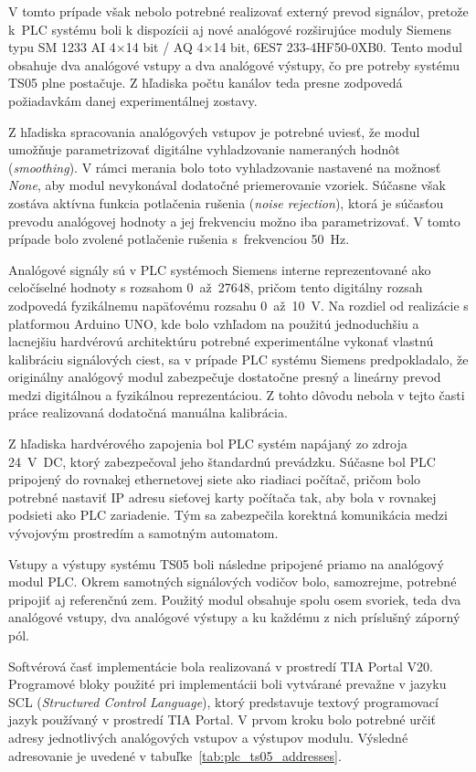 V tomto prípade však nebolo potrebné realizovať externý prevod signálov, pretože
k~PLC systému boli k dispozícii aj nové analógové rozširujúce moduly
Siemens typu SM 1233 AI 4×14 bit / AQ 4×14 bit, 6ES7 233-4HF50-0XB0. Tento modul
obsahuje dva analógové vstupy a dva analógové výstupy, čo pre potreby systému
TS05 plne postačuje. Z hľadiska počtu kanálov teda presne zodpovedá požiadavkám
danej experimentálnej zostavy.

Z hľadiska spracovania analógových vstupov je potrebné uviesť, že modul umožňuje
parametrizovať digitálne vyhladzovanie nameraných hodnôt (\textit{smoothing}).
V rámci merania bolo toto vyhladzovanie nastavené na možnosť \textit{None}, aby modul
nevykonával dodatočné priemerovanie vzoriek. Súčasne však zostáva aktívna funkcia
potlačenia rušenia (\textit{noise rejection}), ktorá je súčasťou prevodu analógovej
hodnoty a jej frekvenciu možno iba parametrizovať. V tomto prípade bolo zvolené potlačenie rušenia s~frekvenciou 50~Hz.

Analógové signály sú v PLC systémoch Siemens interne reprezentované
ako celočíselné hodnoty s rozsahom \mbox{0 až 27648}, pričom tento digitálny
rozsah zodpovedá fyzikálnemu napäťovému rozsahu \mbox{0 až 10~V}. Na rozdiel
od realizácie s platformou Arduino UNO, kde bolo vzhľadom na použitú
jednoduchšiu a lacnejšiu hardvérovú architektúru potrebné experimentálne
vykonať vlastnú kalibráciu signálových ciest, sa v prípade PLC systému
Siemens predpokladalo, že originálny analógový modul zabezpečuje
dostatočne presný a lineárny prevod medzi digitálnou a fyzikálnou reprezentáciou.
Z tohto dôvodu nebola v tejto časti práce realizovaná dodatočná manuálna
kalibrácia.

Z hľadiska hardvérového zapojenia bol PLC systém napájaný zo zdroja
\mbox{24~V~DC}, ktorý zabezpečoval jeho štandardnú prevádzku. Súčasne bol PLC
pripojený do rovnakej ethernetovej siete ako riadiaci počítač, pričom bolo
potrebné nastaviť IP adresu sieťovej karty počítača tak, aby bola v rovnakej
podsieti ako PLC zariadenie. Tým sa zabezpečila korektná komunikácia medzi
vývojovým prostredím a samotným automatom.

Vstupy a výstupy systému TS05 boli následne pripojené priamo na analógový modul
PLC. Okrem samotných signálových vodičov bolo, samozrejme, potrebné pripojiť aj
referenčnú zem. Použitý modul obsahuje spolu osem svoriek, teda dva analógové
vstupy, dva analógové výstupy a ku každému z nich príslušný záporný pól.

Softvérová časť implementácie bola realizovaná v prostredí
TIA Portal V20. Programové bloky použité pri implementácii boli vytvárané prevažne
v jazyku SCL (\textit{Structured Control Language}), ktorý predstavuje
textový programovací jazyk používaný v prostredí TIA Portal. V prvom kroku bolo potrebné určiť adresy jednotlivých
analógových vstupov a výstupov modulu. Výsledné adresovanie je uvedené v
tabuľke~\ref{tab:plc_ts05_addresses}.

